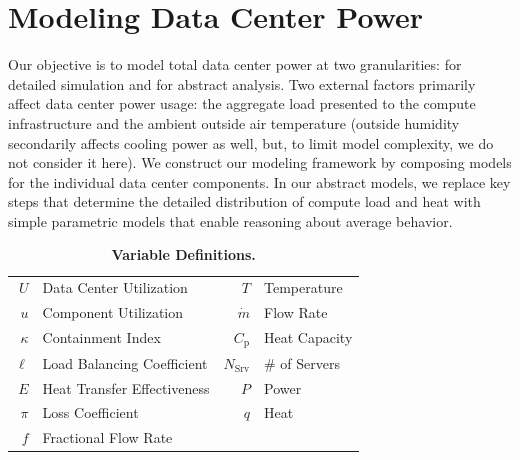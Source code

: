 \section{Modeling Data Center Power} 
\label{section:Model}


Our objective is to model total data center power at two granularities: for detailed simulation and for abstract analysis.  Two external factors primarily affect data center power usage: the aggregate load presented to the compute infrastructure and the ambient outside air temperature (outside humidity secondarily affects cooling power as well, but, to limit model complexity, we do not consider it here).  We construct our modeling framework by composing models for the individual data center components.  In our abstract models, we replace key steps that determine the detailed distribution of compute load and heat with simple parametric models that enable reasoning about average behavior.

\begin{table}[t]
\centering
\caption{ \textbf{Variable Definitions.} }
\label{table::VariableDefinitions}
\begin{tabular}{r l r l}
   \toprule
    $U$ & Data Center Utilization  & $T$ & Temperature \\
    $u$ & Component Utilization & $\dot{m}$ & Flow Rate \\
    $\kappa$ & Containment Index & $C_{\mathrm{p}}$ & Heat Capacity \\
    $\ell$ & Load Balancing Coefficient & $N_{\mathrm{Srv}}$ & \# of Servers \\
    $E$ & Heat Transfer Effectiveness & $P$ & Power \\
    $\pi$ & Loss Coefficient & $q$ & Heat \\
    $f$ & Fractional Flow Rate & & \\

   \bottomrule
  \end{tabular}
\end{table}

